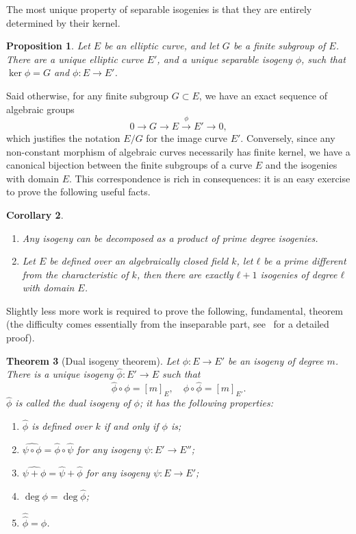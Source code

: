 \documentclass{report}
\theoremstyle{plain}
\newtheorem{theorem}{Theorem}
\newtheorem{corollary}[theorem]{Corollary}
\newtheorem{proposition}[theorem]{Proposition}
\theoremstyle{definition}
\begin{document}
The most unique property of separable isogenies is that they are 
entirely determined by their kernel. %

\begin{proposition}
  Let $E$ be an elliptic curve, and let $G$ be a finite subgroup of
  $E$. %
  There are a unique elliptic curve $E'$, and a unique separable
  isogeny $ϕ$, such that $\ker ϕ=G$ and $ϕ:E\to E'$. %
\end{proposition}

Said otherwise, for any finite subgroup $G⊂E$, we have an exact
sequence of algebraic groups
\begin{equation*}
  0 \to G \to E \overset{ϕ}{\to} E' \to 0,
\end{equation*}
which justifies the notation $E/G$ for the image curve $E'$. %
Conversely, since any non-constant morphism of algebraic curves
necessarily has finite kernel, we have a canonical bijection between
the finite subgroups of a curve $E$ and the isogenies with domain
$E$. %
This correspondence is rich in consequences: it is an easy exercise to
prove the following useful facts. %

\begin{corollary}\ 
  \begin{enumerate}
  \item Any isogeny can be decomposed as a product of prime degree
    isogenies.
  \item Let $E$ be defined over an algebraically closed field $k$, let
    $ℓ$ be a prime different from the characteristic of $k$, then
    there are exactly $ℓ+1$ isogenies of degree $ℓ$ with domain $E$.
  \end{enumerate}
\end{corollary}

Slightly less more work is required to prove the following,
fundamental, theorem (the difficulty comes essentially from the
inseparable part, see~\cite[III.6.1]{silverman:elliptic} for a
detailed proof).

\begin{theorem}[Dual isogeny theorem]
  Let $ϕ:E\to E'$ be an isogeny of degree $m$. %
  There is a unique isogeny $\hat{ϕ}:E'\to E$ such that
  \[\hat{ϕ}∘ϕ = [m]_E, \quad ϕ∘\hat{ϕ} = [m]_{E'}.\] %
  $\hat{ϕ}$ is called the \emph{dual isogeny of $ϕ$}; it has the
  following properties:
  
  \begin{enumerate}
  \item $\hat{ϕ}$ is defined over $k$ if and only if $ϕ$ is;
  \item $\widehat{ψ∘ϕ} = \hat{ϕ}∘\hat{ψ}$ for any isogeny $ψ:E'\to E''$;
  \item $\widehat{ψ+ϕ} = \hat{ψ} + \hat{ϕ}$ for any isogeny $ψ:E\to E'$;
  \item $\deg ϕ = \deg\hat{ϕ}$;
  \item $\hat{\hat{ϕ}} = ϕ$.
  \end{enumerate}
\end{theorem}
\end{document}

